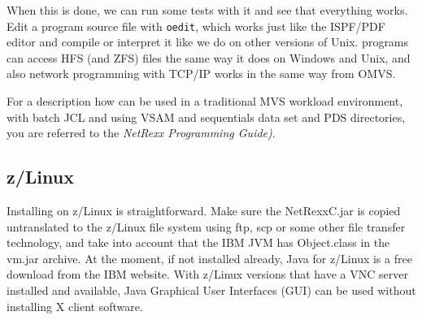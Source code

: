 When this is done, we can run some tests with it and see that
everything works. Edit a program source file with \texttt{oedit},
which works just like the ISPF/PDF editor and compile or interpret it
like we do on other versions of Unix. \nr programs can access HFS (and
ZFS) files the same way it does on Windows and Unix, and also network
programming with TCP/IP works in the same way from OMVS.

For a description how \nr can be used in a traditional MVS
workload environment, with batch JCL and using VSAM and sequentials
data set and PDS directories, you are referred to the \emph{NetRexx
  Programming Guide)}.
\subsection{z/Linux}
Installing on z/Linux is straightforward. Make sure the NetRexxC.jar
is copied untranslated to the z/Linux file system using ftp, scp or
some other file transfer technology, and take into
account that the IBM JVM has Object.class in the vm.jar archive. At
the moment, if not installed already, Java for z/Linux is a free download from the IBM website. With
z/Linux versions that have a VNC server installed and available, Java
Graphical User Interfaces (GUI) can be used without installing X client software. 